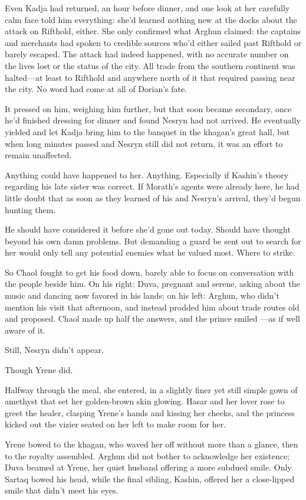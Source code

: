 Even Kadja had returned, an hour before dinner, and one look at her carefully calm face told him everything: she'd learned nothing new at the docks about the attack on Rifthold, either. She only confirmed what Arghun claimed: the captains and merchants had spoken to credible sources who'd either sailed past Rifthold or barely escaped. The attack had indeed happened, with no accurate number on the lives lost or the status of the city. All trade from the southern continent was halted---at least to Rifthold and anywhere north of it that required passing near the city. No word had come at all of Dorian's fate.

It pressed on him, weighing him further, but that soon became secondary, once he'd finished dressing for dinner and found Nesryn had not arrived. He eventually yielded and let Kadja bring him to the banquet in the khagan's great hall, but when long minutes passed and Nesryn still did not return, it was an effort to remain unaffected.

Anything could have happened to her. Anything. Especially if Kashin's theory regarding his late sister was correct. If Morath's agents were already here, he had little doubt that as soon as they learned of his and Nesryn's arrival, they'd begun hunting them.

He should have considered it before she'd gone out today. Should have thought beyond his own damn problems. But demanding a guard be sent out to search for her would only tell any potential enemies what he valued most. Where to strike.

So Chaol fought to get his food down, barely able to focus on conversation with the people beside him. On his right: Duva, pregnant and serene, asking about the music and dancing now favored in his lands; on his left: Arghun, who didn't mention his visit that afternoon, and instead prodded him about trade routes old and proposed. Chaol made up half the answers, and the prince smiled ---as if well aware of it.

Still, Nesryn didn't appear.

Though Yrene did.

Halfway through the meal, she entered, in a slightly finer yet still simple gown of amethyst that set her golden-brown skin glowing. Hasar and her lover rose to greet the healer, clasping Yrene's hands and kissing her cheeks, and the princess kicked out the vizier seated on her left to make room for her.

Yrene bowed to the khagan, who waved her off without more than a glance, then to the royalty assembled. Arghun did not bother to acknowledge her existence; Duva beamed at Yrene, her quiet husband offering a more subdued smile. Only Sartaq bowed his head, while the final sibling, Kashin, offered her a close-lipped smile that didn't meet his eyes.

